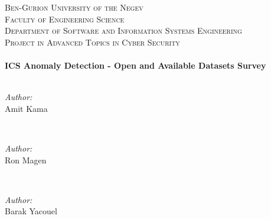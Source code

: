 \documentclass[english,12pt]{article}
\begin{document}
\begin{titlepage}
\textsc{\LARGE Ben-Gurion University of the Negev}\\[1.5cm] 

\textsc{\Large Faculty of Engineering Science}\\[0.5cm] 

\textsc{\large Department of Software and Information Systems
Engineering}\\[0.5cm] 

\textsc{\large Project in Advanced Topics in Cyber Security}\\[0.5cm] 



\HRule \\[0.4cm]
{ \huge \bfseries ICS Anomaly Detection - Open and Available Datasets Survey } \\[0.4cm] 
\HRule \\[1.5cm]
 

\begin{minipage}{0.4\textwidth}
\begin{flushleft} \large \emph{Author:}\\
Amit Kama %
\end{flushleft}
\end{minipage}
~
\begin{minipage}{0.4\textwidth}
\begin{flushright} \large \emph{Author:} \\
Ron Magen %
\end{flushright}
\end{minipage}\\[1cm]

\begin{minipage}{0.4\textwidth}
\begin{flushleft} \large \emph{Author:}\\
Barak Yacouel %
\end{flushleft}
\end{minipage}
~
\begin{minipage}{0.4\textwidth}
\begin{flushleft} \large \emph{ }\\
\end{flushleft}
\end{minipage}\\[2cm]
    

\end{titlepage}
\end{document}
